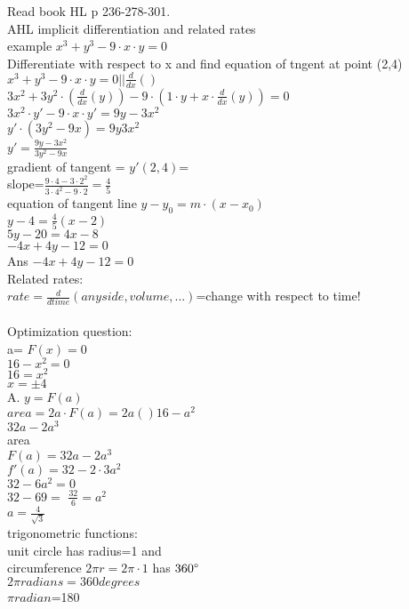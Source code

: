 \documentclass{article}
\begin{document}
  Read book HL p 236-278-301.\\
  AHL implicit differentiation and related rates\\
  example $x^3+y^3-9\cdot x\cdot y=0$\\
  Differentiate with respect to x and find equation of tngent at point (2,4)\\
  $x^3+y^3-9\cdot x\cdot y=0 || \frac{d}{dx}()$\\
  $3x^2+3y^2\cdot(\frac{d}{dx}(y))-9\cdot(1\cdot y+x\cdot\frac{d}{dx}(y))=0$\\
  $3x^2\cdot y'-9\cdot x\cdot y'=9y-3x^2$\\
  $y'\cdot(3y^2-9x)=9y3x^2$\\
  $y'=\frac{9y-3x^2}{3y^2-9x}$\\
  gradient of tangent = $y'(2,4)$=\\
  slope=$\frac{9\cdot4-3\cdot 2^2}{3\cdot4^2-9\cdot2}=\frac{4}{5}$\\
  equation of tangent line $y-y_0=m\cdot (x-x_0)$\\
  $y-4=\frac{4}{5}(x-2)$\\
  $5y-20=4x-8$\\
  $-4x+4y-12=0$\\
  Ans $-4x+4y-12=0$\\
  Related rates:\\
  $rate=\frac{d}{d time}(any side, volume,...)$=change with respect to time!\\
  \\
  Optimization question:\\
  a= $F(x)=0$\\
  $16-x^2=0$\\
  $16=x^2$\\
  $x=\pm4$\\
  A. $y=F(a)$\\
  $area=2a\cdot F(a)=2a()16-a^2$\\ 
  $32a-2a^3$\\
  area \\
  $F(a)=32a-2a^3$\\
  $f'(a)=32-2\cdot3a^2$\\
  $32-6a^2=0$\\
  $32-69=$
  $\frac{32}{6}=a^2$\\
  $a=\frac{4}{\sqrt{3}}$\\
  trigonometric functions:\\
  unit circle has radius=1 and\\
  circumference $2\pi r=2\pi\cdot 1$ has $360\degree$\\
  $2\pi radians=360 degrees$\\
  $\pi radian$=180\\
  
  
  

   
\end{document}
